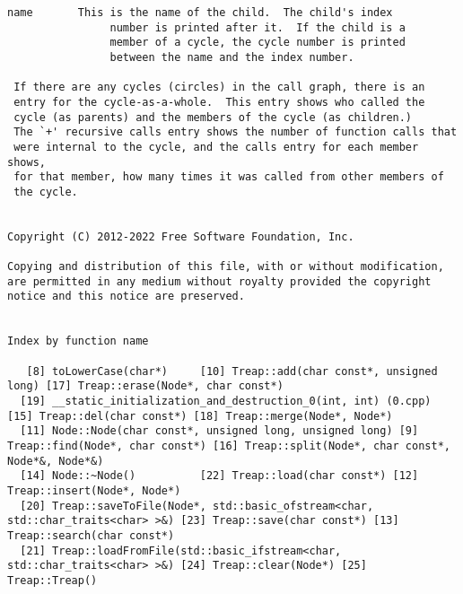 \documentclass[12pt]{article}
\begin{document}
\begin{lstlisting}[breaklines]
     name       This is the name of the child.  The child's index
                number is printed after it.  If the child is a
                member of a cycle, the cycle number is printed
                between the name and the index number.

 If there are any cycles (circles) in the call graph, there is an
 entry for the cycle-as-a-whole.  This entry shows who called the
 cycle (as parents) and the members of the cycle (as children.)
 The `+' recursive calls entry shows the number of function calls that
 were internal to the cycle, and the calls entry for each member shows,
 for that member, how many times it was called from other members of
 the cycle.


Copyright (C) 2012-2022 Free Software Foundation, Inc.

Copying and distribution of this file, with or without modification,
are permitted in any medium without royalty provided the copyright
notice and this notice are preserved.


Index by function name

   [8] toLowerCase(char*)     [10] Treap::add(char const*, unsigned long) [17] Treap::erase(Node*, char const*)
  [19] __static_initialization_and_destruction_0(int, int) (0.cpp) [15] Treap::del(char const*) [18] Treap::merge(Node*, Node*)
  [11] Node::Node(char const*, unsigned long, unsigned long) [9] Treap::find(Node*, char const*) [16] Treap::split(Node*, char const*, Node*&, Node*&)
  [14] Node::~Node()          [22] Treap::load(char const*) [12] Treap::insert(Node*, Node*)
  [20] Treap::saveToFile(Node*, std::basic_ofstream<char, std::char_traits<char> >&) [23] Treap::save(char const*) [13] Treap::search(char const*)
  [21] Treap::loadFromFile(std::basic_ifstream<char, std::char_traits<char> >&) [24] Treap::clear(Node*) [25] Treap::Treap()
\end{lstlisting}
\end{document}
